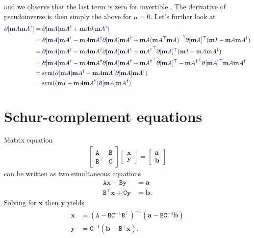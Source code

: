 \documentclass[runningheads]{llncs}
\def\tr{^\top}
\def\m#1{\ensuremath{\mathtt{#1}}}
\def\v#1{\ensuremath{\mathbf{#1}}}
\begin{document}
and we observe that the last term is zero for invertible \mA.  
The derivative of pseudoinverse is then simply the above for $\mu=0$.
Let's further look at 
\begin{align}
\diff[\mA \pinv \mA]
 &= \diff[\mA]\pinv \mA + \mA \diff[\pinv \mA]\\
 &= \diff[\mA]\pinv \mA -
    \mA\pinv \mA \diff[\mA] \pinv \mA +
    \mA\inv{(\mA\tr\mA)} \diff[\mA]\tr(\Id{}-\mA\pinv\mA)\\
 &= \diff[\mA]\pinv \mA-\mA\pinv \mA \diff[\mA] \pinv \mA +
\pinv\mA\tr \diff[\mA]\tr(\Id{}-\mA\pinv\mA)\\
 &= \diff[\mA]\pinv \mA-\mA\pinv \mA \diff[\mA] \pinv \mA +
\pinv\mA\tr \diff[\mA]\tr -
\pinv\mA\tr \diff[\mA]\tr\mA\pinv\mA\\
 &= \sym(\diff[\mA]\pinv \mA-\mA\pinv \mA \diff[\mA] \pinv \mA)\\
 &= \sym((\Id{} - \mA\pinv \mA) \diff[\mA] \pinv \mA)
\end{align}


\section{Schur-complement equations}
Matrix equation
\begin{align}
\begin{bmatrix}
\m A & \m B \\ \m B \tr & \m C
\end{bmatrix}
\begin{bmatrix}
\v x \\ \v y
\end{bmatrix} =
\begin{bmatrix}
\v a \\ \v b
\end{bmatrix}
\end{align}
can be written as two simultaneous equations
\begin{align}
\m A \v x + \m B \v y &= \v a \\
\m B \tr \v x + \m C \v y &= \v b.
\end{align}
Solving for $\v x$ then $\v y$ yields
\begin{align}
\v x & = (\m A - \m B \m C^{-1} \m B \tr)^{-1}
				(\v a - \m B \m C^{-1} \v b) \\
\v y &= \m C^{-1} (\v b - \m B \tr \v x).
\end{align}

\def\real{\mathbb R}

\def\m{\mathbf m}
\def\w{\mathbf w}
\def\v{\mathbf v}
\end{document}
